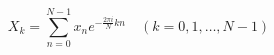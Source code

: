 \documentclass[withoutpreface,bwprint]{../CUMCMThesis/cumcmthesis} %
\begin{document}
\begin{equation}
  X_k = \sum_{n=0}^{N-1} x_n e^{-\frac{2 \pi i}{N}kn} \quad (k=0,1,\ldots,N-1)
\end{equation}
\end{document}
